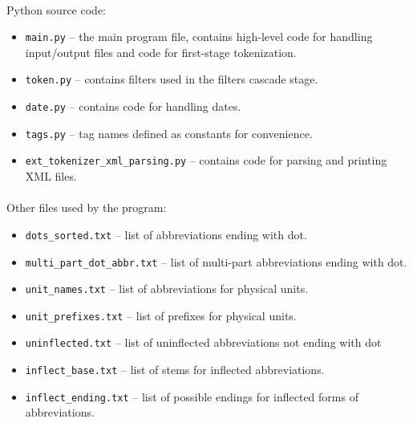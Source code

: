 \documentclass[oneside,12pt]{article}
\begin{document}
\paragraph{}
Python source code:
\begin{itemize}
    \item \texttt{main.py} -- the main program file, contains high-level code for handling input/output files and code for first-stage tokenization.
    
    \item \texttt{token.py} -- contains filters used in the filters cascade stage.
    
    \item \texttt{date.py} -- contains code for handling dates.
    
    \item \texttt{tags.py} -- tag names defined as constants for convenience.
    
    \item \texttt{ext\_tokenizer\_xml\_parsing.py} -- contains code for parsing and printing XML files.
\end{itemize}

\paragraph{}
Other files used by the program:
\begin{itemize}
    \item \texttt{dots\_sorted.txt} -- list of abbreviations ending with dot.
    
    \item \texttt{multi\_part\_dot\_abbr.txt} -- list of multi-part abbreviations ending with dot.
    
    \item \texttt{unit\_names.txt} -- list of abbreviations for physical units.
    
    \item \texttt{unit\_prefixes.txt} -- list of prefixes for physical units.
    
    \item \texttt{uninflected.txt} -- list of uninflected abbreviations not ending with dot
    
    \item \texttt{inflect\_base.txt} -- list of stems for inflected abbreviations.
    
    \item \texttt{inflect\_ending.txt} -- list of possible endings for inflected forms of abbreviations.
\end{itemize}
\end{document}
